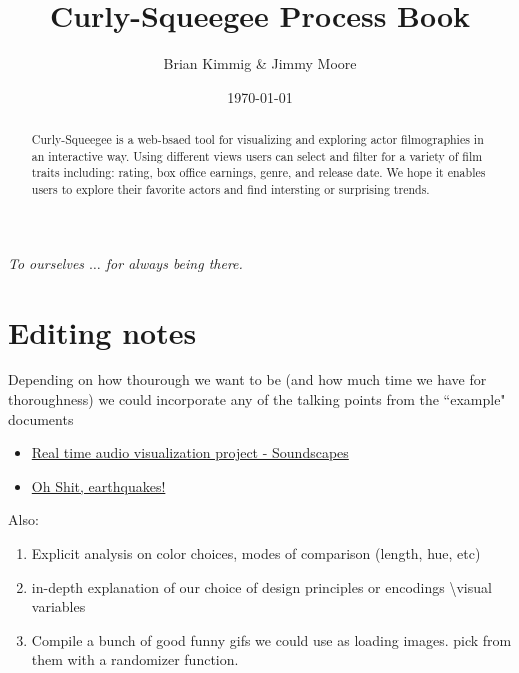 \documentclass[12pt]{article}
\title{Curly-Squeegee Process Book}
\author{ Brian Kimmig \& Jimmy Moore}
\date{\today}
\begin{document}
\maketitle

\begin{abstract}
	Curly-Squeegee is a web-bsaed tool for visualizing and exploring actor filmographies in an interactive way. Using different views users can select and filter for a variety of film traits including: rating, box office earnings, genre, and release date.  We hope it enables users to explore their favorite actors and find intersting or surprising trends.
\end{abstract}

\newpage

\tableofcontents

\newpage


\begin{center}

	\vspace*{\fill}
	\textit{To ourselves $\dots$ for always being there.}
	\vspace*{\fill}
	
\end{center}

\newpage 

\section{Editing notes}

{\color{red}

Depending on how thourough we want to be (and how much time we have for thoroughness) we could incorporate any of the talking points from the ``example" documents
\begin{itemize}
	\item \href{http://dataviscourse.net/2015/assets/process_books/bansal_cao_hou.pdf}{Real time audio visualization project - Soundscapes}
	\item \href{http://dataviscourse.net/2015/assets/process_books/walsh_trevino_bett.pdf}{Oh Shit, earthquakes!}

\end{itemize}

Also:
\begin{enumerate}
	\item Explicit analysis on color choices, modes of comparison (length, hue, etc)
	\item in-depth explanation of our  choice of design principles or encodings \textbackslash visual variables
		\item Compile a bunch of good funny gifs we could use as loading images.  pick from them with a randomizer function.
	
\end{enumerate}
}
\end{document}
